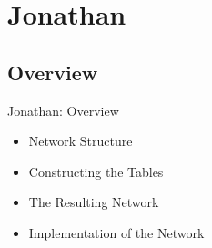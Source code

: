 \section{Jonathan}
\subsection{Overview}
\begin{frame}{Jonathan: Overview}
\begin{itemize}
\item Network Structure
\item Constructing the Tables
\item The Resulting Network
\item Implementation of the Network
\end{itemize}
\end{frame}

